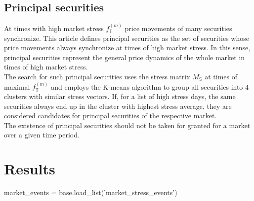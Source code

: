 \documentclass[11pt,twoside,a4paper]{article}
\numberwithin{equation}{section}
\begin{document}
\subsection{Principal securities}
At times with high market stress $f^{(m)}_\mathbb{T}$ price movements of many securities synchronize. This article defines principal securities as the set of securities whose price movements always synchronize at times of high market stress. In this sense, principal securities represent the general price dynamics of the whole market in times of high market stress.\\
The search for such principal securities uses the stress matrix $M_\mathbb{S}$ at times of maximal $f^{(m)}_\mathbb{T}$ and employs the K-means algorithm to group all securities into 4 clusters with similar stress vectors. If, for a list of high stress days, the same securities always end up in the cluster with highest stress average, they are considered candidates for principal securities of the respective market.\\
The existence of principal securities should not be taken for granted for a market over a given time period.
\FloatBarrier
\pagebreak
\section{Results}
\begin{pycode}
market_events = base.load_list('market_stress_events')
\end{pycode}
\end{document}

